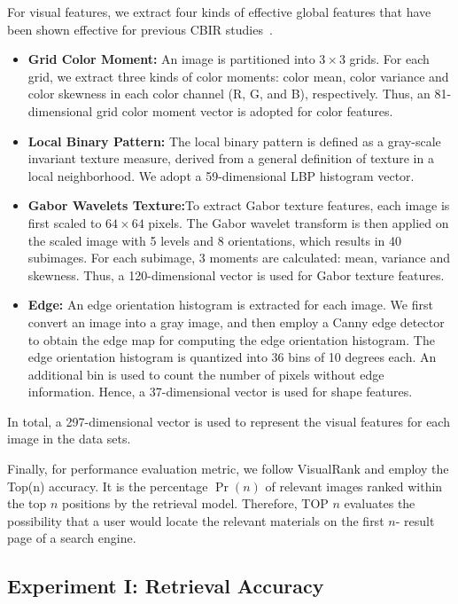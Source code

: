 For visual features, we extract four kinds of effective global features that have been shown effective for previous CBIR studies~\cite{mm/ZhuHLY08}.
\begin{itemize}
\item {\bf Grid Color Moment:} An image is partitioned into $3\times 3$ grids. For each grid, we extract three kinds of color moments: color mean, color variance and color skewness in each color channel (R, G, and B), respectively. Thus, an 81-dimensional grid color moment vector is adopted for color features.
\item {\bf Local Binary Pattern:} The local binary pattern\cite{pr/OjalaPH96} is defined as a gray-scale invariant texture measure, derived from a general definition of texture in a local neighborhood. We adopt a 59-dimensional LBP histogram vector.
\item {\bf Gabor Wavelets Texture:}To extract Gabor texture features, each image is first scaled to $64\times 64$ pixels. The Gabor wavelet
    transform\cite{tc/LadesVBLMWK93} is then applied on the scaled image with 5 levels and 8 orientations, which results in 40 subimages. For each subimage, 3 moments are calculated: mean, variance and skewness. Thus, a 120-dimensional vector is used for Gabor texture features.
\item {\bf Edge:} An edge orientation histogram is extracted for each image. We first convert an image into a gray image, and then employ a Canny edge detector to obtain the edge map for computing the edge orientation histogram. The edge orientation histogram is quantized into 36 bins of 10 degrees each. An additional bin is used to count the number of pixels without edge information. Hence, a 37-dimensional vector is used for shape features.
\end{itemize}
In total, a 297-dimensional vector is used to represent the visual features for each image in the data sets.

Finally, for performance evaluation metric,  we follow
VisualRank\cite{pami/JingB08} and employ the Top(n) accuracy. It is the percentage $\Pr(n)$ of relevant images ranked within the top $n$ positions by the retrieval model. Therefore, TOP $n$ evaluates the possibility that a user would locate the relevant materials on the first $n$- result page of a search engine.

\subsection{Experiment I: Retrieval Accuracy}

